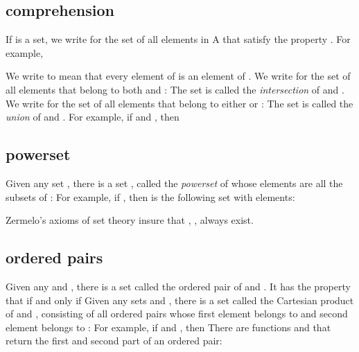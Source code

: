 \documentclass[cup9a]{cupbook}
\begin{document}
\subsection{comprehension}

If  is a set, we write
for the set of all elements in A that satisfy the property .
For example,



We write  to mean that every element of  is an element of .
We write  for the set of all elements that belong to both  and :
The set  is called the {\it intersection} of  and .
We write  for the set of all elements that belong to either  or :
The set  is called the {\it union} of  and .
For example, if  and , then

\subsection{powerset}

Given any set , there is a set , called the {\it powerset} of  whose elements are  all the subsets of :
For example, if , then  is the following set with
 elements:


Zermelo's axioms of set theory insure that , ,  always exist.

\subsection{ordered pairs}

Given any  and , there is a set  called the ordered pair
of  and .  It has the property that  if and only if
Given any sets  and , there is a set  called the Cartesian product of  and , consisting of all ordered pairs whose first element belongs to  and second element belongs to :
For example, if  and , then
There are functions  and  that return the first and second part of an ordered pair:
\end{document}
